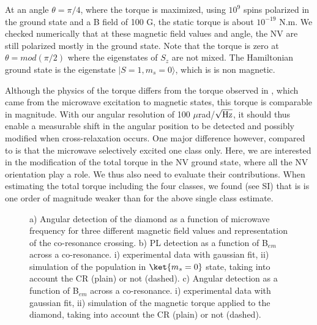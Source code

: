 \documentclass[preprintnumbers,amsmath,amssymb,superscriptaddress,twocolumn,showpacs]{revtex4-1}
\begin{document}
At an angle $\theta=\pi/4$, where the torque is maximized, using $10^9$ spins polarized in the ground state and a B field of 100 G, the static torque is about $10^{-19}$ N.m.
We checked numerically that at these magnetic field values and angle, the NV are still polarized mostly in the ground state. 
Note that the torque is zero at $\theta=mod (\pi/2)$ where the eigenstates of $S_z$ are not mixed. The Hamiltonian ground state is the eigenstate $| S=1,m_s=0\rangle$, which is is non magnetic. 

Although the physics of the torque differs from the torque observed in \cite{DelordNat}, which came from the microwave excitation to magnetic states, this torque is comparable in magnitude. With our angular resolution of 100 $\mu$rad/$\sqrt{\rm Hz}$, it should thus enable a measurable shift in the angular position to be detected and possibly modified when cross-relaxation occurs. 
One major difference however, compared to \cite{DelordNat} is that the microwave selectively excited one class only. 
Here, we are interested in the modification of the total torque in the NV ground state, where all the NV orientation play a role. We thus also need to evaluate their contributions.
When estimating the total torque including the four classes, we found (see SI) that is is one order of magnitude weaker than for the above single class estimate.

\begin{figure*}[!ht]
  \centering {}
  \caption{a) Angular detection of the diamond as a function of microwave frequency for three different magnetic field values and representation of the co-resonance crossing.
b) PL detection as a function of B$_{em}$ across a co-resonance. i) experimental data with gaussian fit, ii) simulation of the population in $\ket{m_s=0}$ state, taking into account the CR (plain) or not (dashed).
c) Angular detection as a function of B$_{em}$ across a co-resonance. i) experimental data with gaussian fit, ii) simulation of the magnetic torque applied to the diamond, taking into account the CR (plain) or not (dashed).
  }
  \label{data}
\end{figure*}
\end{document}
